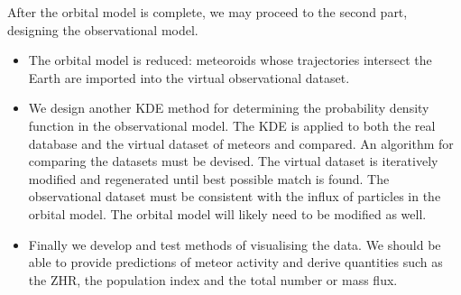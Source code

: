     After the orbital model is complete, we may proceed to the second part, designing the observational model.
    \begin{itemize}
        \item The orbital model is reduced: meteoroids whose trajectories intersect the Earth
            are imported into the virtual observational dataset.
        \item We design another KDE method for determining the probability density function
            in the observational model. The KDE is applied to both the real database and the virtual dataset
            of meteors and compared. An algorithm for comparing the datasets must be devised.
            The virtual dataset is iteratively modified and regenerated until best possible match is found.
            The observational dataset must be consistent with the influx of particles in the orbital model.
            The orbital model will likely need to be modified as well.
        \item Finally we develop and test methods of visualising the data. We should be able to provide
            predictions of meteor activity and derive quantities such as the ZHR, the population index
            and the total number or mass flux.
    \end{itemize}
